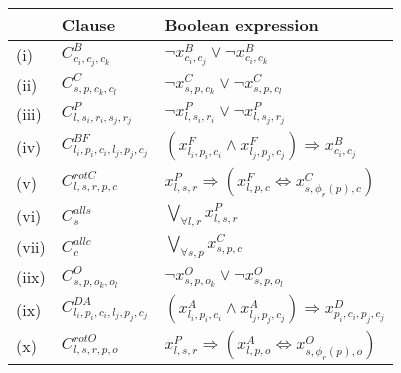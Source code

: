 \begin{table}[h!]
    \centering
    \begin{tabular}{|l|l|l|}
        \hline
        & Clause & Boolean expression \\ [0.5ex] 
        \hline
        \hline
        (i) & \(C^{B}_{c_i,c_j,c_k}\) & \(\neg x_{c_i,c_j}^{B} \lor \neg x_{c_i,c_k}^{B}\) \\ %
        (ii) &  \(C^{C}_{s,p,c_k,c_l}\) & \(\neg x_{s, p, c_k}^{C} \lor \neg x_{s, p, c_l}^{C}\) \\ %
        (iii) & \(C^{P}_{l, s_i, r_i, s_j, r_j}\)  & \(\neg x_{l,s_i,r_i}^{P} \lor \neg x_{l,s_j,r_j}^{P} \) \\ %
        (iv) & \(C^{BF}_{l_i,p_i,c_i,l_j,p_j,c_j}\) & \(\left(x_{l_i,p_i,c_i}^{F} \land x_{l_j,p_j,c_j}^{F} \right) \Rightarrow x_{c_i,c_j}^{B}\) \\ %
        (v) & \(C^{rotC}_{l,s,r,p,c}\) & \(x_{l,s,r}^{P} \Rightarrow \left(x_{l,p,c}^{F} \Leftrightarrow x_{s, \phi_r(p), c}^{C}\right)\) \\ %
        (vi) & \(C^{all s}_{s}\)  & \(\bigvee_{\forall l, r} x_{l,s,r}^{P}\) \\ %
        (vii) & \(C^{all c}_{c}\)  & \(\bigvee_{\forall s, p} x_{s,p,c}^{C}\) \\ %
        (iix) &  \(C^{O}_{s,p,o_k,o_l}\) & \(\neg x_{s, p, o_k}^{O} \lor \neg x_{s, p, o_l}^{O}\) \\ %
        (ix) & \(C^{DA}_{l_i,p_i,c_i,l_j,p_j,c_j}\) & \(\left(x_{l_i,p_i,c_i}^{A} \land x_{l_j,p_j,c_j}^{A} \right) \Rightarrow x_{p_i,c_i,p_j,c_j}^{D}\) \\ %
        (x) & \(C^{rotO}_{l,s,r,p,o}\) & \(x_{l,s,r}^{P} \Rightarrow \left(x_{l,p,o}^{A} \Leftrightarrow x_{s, \phi_r(p), o}^{O}\right)\) \\ %
        

\end{tabular}
\end{table}
